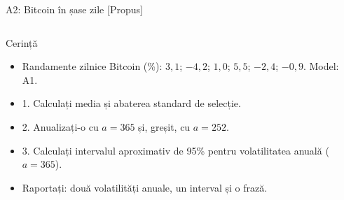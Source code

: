 \begin{frame}{A2: Bitcoin în șase zile [Propus]}
\propsub
\itemsize{\scriptsize}
\begin{columns}[T]
\begin{column}{\taskw}
\begin{block}{Cerință}
\begin{itemize}
    \item Randamente zilnice Bitcoin (\%): $3{,}1$; $-4{,}2$; $1{,}0$; $5{,}5$; $-2{,}4$; $-0{,}9$. Model: A1.
    \item 1. Calculați media și abaterea standard de selecție.
    \item 2. Anualizați-o cu $a = 365$ și, greșit, cu $a = 252$.
    \item 3. Calculați intervalul aproximativ de 95\% pentru volatilitatea anuală ($a = 365$).
    \item Raportați: două volatilități anuale, un interval și o frază.
\end{itemize}
\end{block}
\end{column}
\begin{column}{\solw}
\end{column}
\end{columns}
\end{frame}

